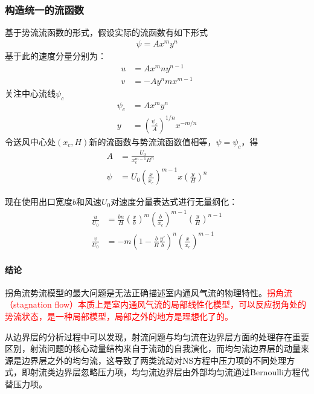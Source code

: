 \subsubsection{构造统一的流函数}
基于势流流函数的形式，假设实际的流函数有如下形式
\begin{align}
    \psi=Ax^{m}y^{n}
\end{align}
基于此的速度分量分别为：
\begin{align}
        u &= Ax^{m}ny^{n-1}\\
        v &= -Ay^{n}mx^{m-1}
\end{align}
关注中心流线$\psi_{c}$
\begin{align*}
    \psi_{c}&=Ax^{m}y^{n}\\
    y&=\left(\frac{\psi_{c}}{A}\right)^{1/n}x^{-m/n}
\end{align*}
令送风中心处$(x_c, H)$新的流函数与势流流函数值相等，$\psi=\psi_{c}$，得
\begin{align}
    A&=\frac{U_{0}}{x_{c}^{m-1}H^{n}}\\
    \psi &= U_{0}\left(\frac{x}{x_{c}}\right)^{m-1}x\left(\frac{y}{H}\right)^{n}
\end{align}

现在使用出口宽度$b$和风速$U_{0}$对速度分量表达式进行无量纲化：
\begin{align}
    \frac{u}{U_{0}}&=\frac{bn}{H}\left(\frac{x}{b}\right)^{m}\left(\frac{b}{x_{c}}\right)^{m-1}\left(\frac{y}{H}\right)^{n-1}\\
    \frac{v}{U_{0}}&=-m\left(1-\frac{b}{H}\frac{y'}{b}\right)^{n}\left(\frac{x}{x_{c}}\right)^{m-1}
\end{align}

\paragraph{结论}

拐角流势流模型的最大问题是无法正确描述室内通风气流的物理特性。\textcolor{red}{拐角流（stagnation flow）本质上是室内通风气流的局部线性化模型，可以反应拐角处的势流状态，是一种局部模型，局部之外的地方是理想化了的。}

从边界层的分析过程中可以发现，射流问题与均匀流在边界层方面的处理存在重要区别，射流问题的核心动量结构来自于流动的自我演化，而均匀流边界层的动量来源是边界层之外的均匀流，这导致了两类流动对NS方程中压力项的不同处理方式，即射流类边界层忽略压力项，均匀流边界层由外部均匀流通过Bernoulli方程代替压力项。
